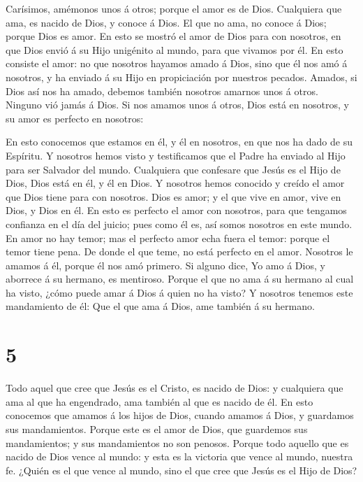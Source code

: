  Carísimos, amémonos unos á otros; porque el amor es de
Dios. Cualquiera que ama, es nacido de Dios, y conoce á Dios.
 El que no ama, no conoce á Dios; porque Dios es amor.
 En esto se mostró el amor de Dios para con nosotros, en que
Dios envió á su Hijo unigénito al mundo, para que vivamos por él.
 En esto consiste el amor: no que nosotros hayamos amado á
Dios, sino que él nos amó á nosotros, y ha enviado á su Hijo en
propiciación por nuestros pecados.  Amados, si Dios así nos
ha amado, debemos también nosotros amarnos unos á otros. 
Ninguno vió jamás á Dios. Si nos amamos unos á otros, Dios está en
nosotros, y su amor es perfecto en nosotros:

 En esto conocemos que estamos en él, y él en nosotros, en
que nos ha dado de su Espíritu.  Y nosotros hemos visto y
testificamos que el Padre ha enviado al Hijo para ser Salvador del
mundo.  Cualquiera que confesare que Jesús es el Hijo de
Dios, Dios está en él, y él en Dios.  Y nosotros hemos
conocido y creído el amor que Dios tiene para con nosotros. Dios es
amor; y el que vive en amor, vive en Dios, y Dios en él. 
En esto es perfecto el amor con nosotros, para que tengamos confianza en
el día del juicio; pues como él es, así somos nosotros en este mundo.
 En amor no hay temor; mas el perfecto amor echa fuera el
temor: porque el temor tiene pena. De donde el que teme, no está
perfecto en el amor.  Nosotros le amamos á él, porque él
nos amó primero.  Si alguno dice, Yo amo á Dios, y aborrece
á su hermano, es mentiroso. Porque el que no ama á su hermano al cual ha
visto, ¿cómo puede amar á Dios á quien no ha visto?  Y
nosotros tenemos este mandamiento de él: Que el que ama á Dios, ame
también á su hermano.

\hypertarget{section-4}{%
\section{5}\label{section-4}}

 Todo aquel que cree que Jesús es el Cristo, es nacido de
Dios: y cualquiera que ama al que ha engendrado, ama también al que es
nacido de él.  En esto conocemos que amamos á los hijos de
Dios, cuando amamos á Dios, y guardamos sus mandamientos. 
Porque este es el amor de Dios, que guardemos sus mandamientos; y sus
mandamientos no son penosos.  Porque todo aquello que es
nacido de Dios vence al mundo: y esta es la victoria que vence al mundo,
nuestra fe.  ¿Quién es el que vence al mundo, sino el que
cree que Jesús es el Hijo de Dios?

